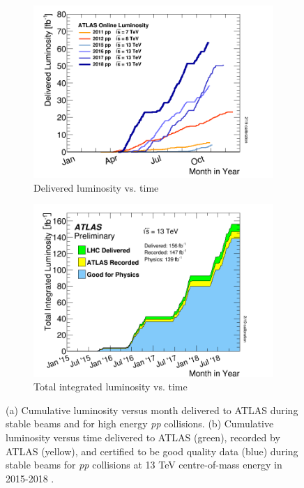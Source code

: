\documentclass[12pt,a4paper,epsf,portrait,times,epsfig]{report}
\begin{document}
		\begin{figure}
			\begin{subfigure}{.49\textwidth}
				\centering
				\includegraphics[scale=0.27]{ATLAS_Luminosity_Time.png}
				\caption{Delivered luminosity vs. time}
				\label{Fig:SFigATLASLuminosityTime}
			\end{subfigure}
			\begin{subfigure}{.49\textwidth}
				\centering
				\includegraphics[scale=0.27]{ATLAS_Luminosity_Total.png}
				\caption{Total integrated luminosity vs. time}
				\label{Fig:SFigATLASLuminosityTotal}
			\end{subfigure}
			\caption{ (a) Cumulative luminosity versus month delivered to ATLAS during stable beams and for high energy \textit{pp} collisions. (b) Cumulative luminosity versus time delivered to ATLAS (green), recorded by ATLAS (yellow), and certified to be good quality data (blue) during stable beams for \textit{pp} collisions at 13 TeV centre-of-mass energy in 2015-2018 \cite{ATLASLumiPublic}.}
			\label{Fig:ATLASLuminosity}
		\end{figure}
\end{document}

